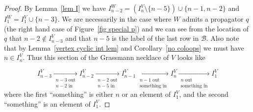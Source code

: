 \documentclass[11pt]{article}
\theoremstyle{remark}
\theoremstyle{definition}
\begin{document}
\begin{proof}
  By Lemma~\ref{lem I} we have $I_{n-2}^{W}= (I_{n}^{V} \setminus \{n-5\})\cup \{n-1,n-2\}$ and $I_1^W = I_1^V\cup \{n-3\}$. We are necessarily in the case where $W$ admits a propagator $q$ (the right hand case of Figure~\ref{fig special p}) and we can see from the location of $q$ that $n-2\not\in I_{n-3}^{V}$ and that $n-5$ is the label of the last row in $\mathcal{B}$.  Also note that by Lemma~\ref{vertex cyclic int lem} and Corollary~\ref{no coloops} we must have $n\in I_n^V$. Thus this section of the Grassmann necklace of $V$ looks like

  \begin{equation}\label{eq necklace}
  I_{n-3}^{V} \xrightarrow[\substack{n-3\text{ out}\\n-2\text{ in}}]{} I_{n-2}^{V} \xrightarrow[\substack{n-2\text{ out}\\n-5\text{ in}}]{} I_{n-1}^{V} \xrightarrow[\substack{n-1\text{ out}\\\text{something in}}]{} I_{n}^{V}  \xrightarrow[\substack{n \text{ out}\\\text{something in}}]{} I_1^{V}
  \end{equation}
  where the first ``something'' is either $n$ or an element of $I_1^{V}$, and the second ``something'' is an element of $I_1^{V}$.


\end{proof}
\end{document}
